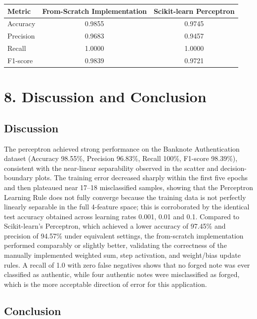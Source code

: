 \documentclass[11pt]{article}
\begin{document}
\begin{tabular}{|p{4cm}|c|c|}
\hline
Metric & From-Scratch Implementation & Scikit-learn Perceptron\\
\hline
Accuracy & 0.9855 & 0.9745\\
\hline
Precision & 0.9683 & 0.9457\\
\hline
Recall & 1.0000 & 1.0000\\
\hline
F1-score & 0.9839 & 0.9721\\
\hline
\end{tabular}


\section*{8. Discussion and Conclusion}

\subsection*{Discussion}

The perceptron achieved strong performance on the Banknote Authentication dataset (Accuracy 98.55\%, Precision 96.83\%, Recall 100\%, F1-score 98.39\%), consistent with the near-linear separability observed in the scatter and decision-boundary plots. The training error decreased sharply within the first five epochs and then plateaued near 17--18 misclassified samples, showing that the Perceptron Learning Rule does not fully converge because the training data is not perfectly linearly separable in the full 4-feature space; this is corroborated by the identical test accuracy obtained across learning rates 0.001, 0.01 and 0.1. Compared to Scikit-learn's Perceptron, which achieved a lower accuracy of 97.45\% and precision of 94.57\% under equivalent settings, the from-scratch implementation performed comparably or slightly better, validating the correctness of the manually implemented weighted sum, step activation, and weight/bias update rules. A recall of 1.0 with zero false negatives shows that no forged note was ever classified as authentic, while four authentic notes were misclassified as forged, which is the more acceptable direction of error for this application.

\subsection*{Conclusion}
\end{document}
